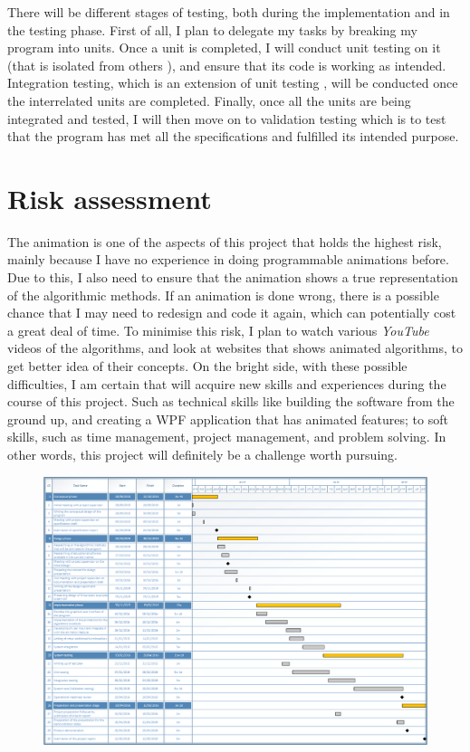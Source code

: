 \documentclass[12pt,a4paper,oneside]{report}
\begin{document}
There will be different stages of testing, both during the implementation and in the testing phase. First of all, I plan to delegate my tasks by breaking my program into units. Once a unit is completed, I will conduct unit testing on it (that is isolated from others \cite{_unit_2003}), and ensure that its code is working as intended. Integration testing, which is an extension of unit testing \cite{_integration_2003}, will be conducted once the interrelated units are completed. Finally, once all the units are being integrated and tested, I will then move on to validation testing which is to test that the program has met all the specifications and fulfilled its intended purpose.

\section*{Risk assessment}
The animation is one of the aspects of this project that holds the highest risk, mainly because I have no experience in doing programmable animations before. Due to this, I also need to ensure that the animation shows a true representation of the algorithmic methods. If an animation is done wrong, there is a possible chance that I may need to redesign and code it again, which can potentially cost a great deal of time. To minimise this risk, I plan to watch various \textit{YouTube} videos of the algorithms, and look at websites that shows animated algorithms, to get better idea of their concepts. On the bright side, with these possible difficulties, I am certain that will acquire new skills and experiences during the course of this project. Such as technical skills like building the software from the ground up, and creating a WPF application that has animated features; to soft skills, such as time management, project management, and problem solving. In other words, this project will definitely be a challenge worth pursuing.
\printbibliography[heading=secbib]

\begin{landscape}
\begin{figure}[H]
\centering
\hspace*{0cm}
\includegraphics[scale=0.77]{images/specification_ganttChart.png}
\end{figure}
\end{landscape}

\end{document}
